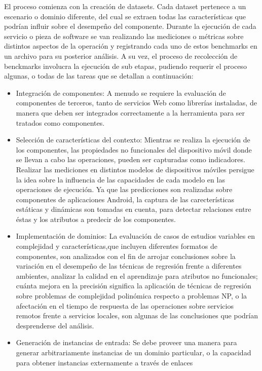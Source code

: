 \noindent El proceso comienza con la creación de datasets. Cada dataset
pertenece a un escenario o dominio diferente, del cual se extraen
todas las características que podrían influir sobre el desempeño del
componente. Durante la ejecución de cada servicio o pieza de software
se van realizando las mediciones o métricas sobre distintos aspectos
de la operación y registrando cada uno de estos benchmarks en un archivo
para su posterior análisis. A su vez, el proceso de recolección de
benckmarks involucra la ejecución de sub etapas, pudiendo requerir
el proceso algunas, o todas de las tareas que se detallan a continuación:
\begin{itemize}
\item Integración de componentes: A menudo se requiere la evaluación de
componentes de terceros, tanto de servicios Web como librerías instaladas,
de manera que deben ser integrados correctamente a la herramienta
para ser tratados como componentes. 
\item Selección de características del contexto: Mientras se realiza la
ejecución de los componentes, las propiedades no funcionales del dispositivo
móvil donde se llevan a cabo las operaciones, pueden ser capturadas
como indicadores. Realizar las mediciones en distintos modelos de
dispositivos móviles persigue la idea sobre la influencia de las capacidades
de cada modelo en las operaciones de ejecución. Ya que las predicciones
son realizadas sobre componentes de aplicaciones Android, la captura
de las carecterísticas estáticas y dinámicas son tomadas en cuenta,
para detectar relaciones entre éstas y los atributos a predecir de
los componentes.
\item Implementación de dominios: La evaluación de casos de estudios variables
en complejidad y características,que incluyen diferentes formatos
de componentes, son analizados con el fin de arrojar conclusiones
sobre la variación en el desempeño de las técnicas de regresión frente
a diferentes ambientes, analizar la calidad en el aprendizaje para
atributos no funcionales; cuánta mejora en la precisión significa
la aplicación de técnicas de regresión sobre problemas de complejidad
polinómica respecto a problemas NP, o la afectación en el tiempo de
respuesta de las operaciones sobre servicios remotos frente a servicios
locales, son algunas de las conclusiones que podrían desprenderse
del análisis. 
\item Generación de instancias de entrada: Se debe proveer una manera para
generar arbitrariamente instancias de un dominio particular, o la
capacidad para obtener instancias externamente a través de enlaces

\end{itemize}
